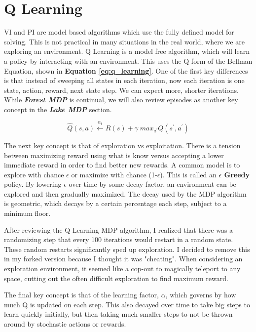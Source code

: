 \documentclass[letterpaper]{article} %
\begin{document}
\section{Q Learning}
VI and PI are model based algorithms which use the fully defined model for solving.  This is not practical in many situations in the real world, where we are exploring an environment.  Q Learning is a model free algorithm, which will learn a policy by interacting with an environment.  This uses the Q form of the Bellman Equation, shown in \textbf{Equation \ref{eq:q_learning}}.  One of the first key differences is that instead of sweeping all states in each iteration, now each iteration is one state, action, reward, next state step.  We can expect more, shorter iterations.   While \textbf{\emph{Forest MDP}} is continual, we will also review episodes as another key concept in the \textbf{\emph{Lake MDP}} section.

\begin{equation} 
\label{eq:q_learning}
\hat{Q}(s,a) \xleftarrow{\alpha_t} R(s) + \gamma \;  max_{a^\prime} Q(s^\prime, a^\prime)
\end{equation}

The next key concept is that of exploration vs exploitation. There is a tension between maximizing reward using what is know versus accepting a lower immediate reward in order to find better new rewards.  A common model is to explore with chance $\epsilon$ or maximize with chance (1-$\epsilon$).  This is called an \textbf{$\epsilon$ Greedy} policy.  By lowering $\epsilon$ over time by some decay factor, an environment can be explored and then gradually maximized.  The decay used by the MDP algorithm is geometric, which decays by a certain percentage each step, subject to a minimum floor.

After reviewing the Q Learning MDP algorithm, I realized that there was a randomizing step that every 100 iterations would restart in a random state. These random restarts significantly sped up exploration. I decided to remove this in my forked version because I thought it was "cheating".  When considering an exploration environment, it seemed like a cop-out to magically teleport to any space, cutting out the often difficult exploration to find maximum reward.  

The final key concept is that of the learning factor, \textbf{$\alpha$}, which governs by how much Q is updated on each step. This also decayed over time to take big steps to learn quickly initially, but then taking much smaller steps to not be thrown around by stochastic actions or rewards. 
\end{document}
